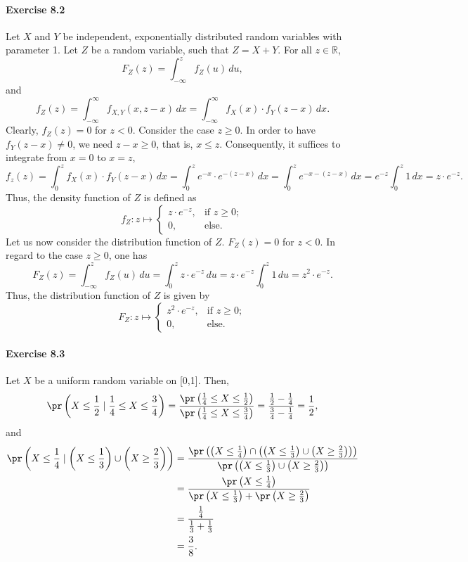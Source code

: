 \paragraph{Exercise 8.2} Let $X$ and $Y$ be independent, exponentially distributed
random variables with parameter 1. Let $Z$ be a random variable,
such that $Z = X + Y$. For all $z \in \mathbb{R}$,
\[
    F_Z(z) = \int_{- \infty}^{z} f_Z(u) \, du,
\]
and
\[
    f_Z(z)
        = \int_{- \infty}^{\infty} f_{X,Y}(x,z-x) \, dx
        = \int_{- \infty}^{\infty} f_X(x)\cdot f_Y(z-x) \, dx.
\]
Clearly, $f_Z(z) = 0$ for $z < 0$. Consider the case $z \geq 0$. In order to have
$f_Y(z-x) \not= 0$, we need $z-x \geq 0$, that is, $x \leq z$. Consequently, it
suffices to integrate from $x=0$ to $x = z$,
\[
    f_z(z)
        = \int_{0}^{z} f_X(x)\cdot f_Y(z-x) \, dx
        = \int_{0}^{z} e^{-x} \cdot e^{-(z-x)} \, dx
        = \int_{0}^{z} e^{-x-(z-x)} \, dx
        = e^{-z} \int_{0}^{z} 1 \, dx
        = z \cdot e^{-z}.
\]
Thus, the density function of $Z$ is defined as
\[
    f_Z: z \mapsto
    \begin{cases}
        z \cdot e^{-z}, &\text{if }z  \geq 0; \\
        0,  &\text{else.}
    \end{cases}
\]
Let us now consider the distribution function of $Z$. $F_Z(z) = 0$ for $z < 0$.
In regard to the case $z \geq 0$, one has
\[
    F_Z(z)
        = \int_{- \infty}^{z} f_Z(u) \, du
        = \int_{0}^{z} z \cdot e^{-z} \, du
        = z \cdot e^{-z} \int_{0}^{z} 1 \, du
        = z^2 \cdot e^{-z}.
\]
Thus, the distribution function of $Z$ is given by
\[
    F_Z: z \mapsto
    \begin{cases}
        z^2 \cdot e^{-z},   &\text{if }z \geq 0; \\
        0,                  &\text{else.}
    \end{cases}
\]

\paragraph{Exercise 8.3} Let $X$ be a uniform random variable on [0,1]. Then,
\[
    \pr\left(X \leq \frac{1}{2} \mid \frac{1}{4} \leq X \leq \frac{3}{4}\right)
    = \frac{\pr\left(\frac{1}{4} \leq X \leq \frac{1}{2}\right)}{\pr\left(\frac{1}{4} \leq X \leq \frac{3}{4}\right)}
    = \frac{\frac{1}{2} - \frac{1}{4}}{\frac{3}{4} - \frac{1}{4}}
    = \frac{1}{2},
\]
and
\begin{align*}
    \pr\left(X \leq \frac{1}{4} \mid \left(X \leq \frac{1}{3}\right) \cup \left( X \geq \frac{2}{3}\right) \right)
    &= \frac{\pr\left(\left(X \leq \frac{1}{4} \right) \cap \left( \left(X \leq \frac{1}{3}\right) \cup \left( X \geq \frac{2}{3}\right) \right) \right)}{\pr\left(\left(X \leq \frac{1}{3}\right) \cup \left( X \geq \frac{2}{3}\right) \right)} \\
    &= \frac{\pr\left(X \leq \frac{1}{4}\right)}{\pr\left(X \leq \frac{1}{3} \right) + \pr\left(X \geq \frac{2}{3}\right)} \\
    & = \frac{\frac{1}{4}}{\frac{1}{3} + \frac{1}{3}} \\
    &= \frac{3}{8}.
\end{align*}
